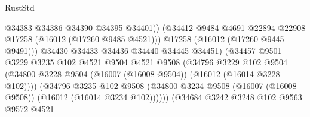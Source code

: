 \begin{lexlean}{RustStd}
\begin{coremodule}
                                            @34383
                                            @34386
                                            @34390
                                            @34395
                                            @34401))
                                        (@34412
                                          @9484
                                          @4691
                                          @22894
                                          @22908
                                          @17258
                                          (@16012 (@17260 @9485 @4521)))
                                        @17258
                                        (@16012 (@17260 @9445 @9491)))
                                      @34430
                                      @34433
                                      @34436
                                      @34440
                                      @34445
                                      @34451)
                                    (@34457
                                      @9501
                                      @3229
                                      @3235
                                      @102
                                      @4521
                                      @9504
                                      @4521
                                      @9508
                                      (@34796
                                        @3229
                                        @102
                                        @9504
                                        (@34800
                                          @3228
                                          @9504
                                          (@16007 (@16008 @9504))
                                          (@16012 (@16014 @3228 @102))))
                                      (@34796
                                        @3235
                                        @102
                                        @9508
                                        (@34800
                                          @3234
                                          @9508
                                          (@16007 (@16008 @9508))
                                          (@16012 (@16014 @3234 @102))))))
                                  (@34684
                                    @3242
                                    @3248
                                    @102
                                    @9563
                                    @9572
                                    @4521

\end{coremodule}
\end{lexlean}

